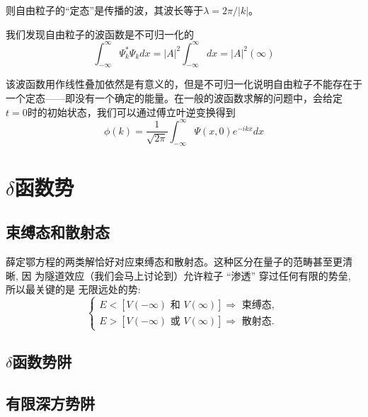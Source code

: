 	则自由粒子的“定态”是传播的波，其波长等于$\lambda=2 \pi /|k|$。

	我们发现自由粒子的波函数是不可归一化的
	\begin{equation}
		\int_{-\infty}^{\infty} \Psi_{k}^{*} \Psi_{k} d x=|A|^{2} \int_{-\infty}^{\infty} d x=|A|^{2}(\infty)
	\end{equation}

	该波函数用作线性叠加依然是有意义的，但是不可归一化说明自由粒子不能存在于一个定态——即没有一个确定的能量。在一般的波函数求解的问题中，会给定$t=0$时的初始状态，我们可以通过傅立叶逆变换得到
	\begin{equation}
		\phi(k)=\frac{1}{\sqrt{2 \pi}} \int_{-\infty}^{\infty} \Psi(x, 0) e^{-i k x} d x
	\end{equation}
\section{$\delta$函数势}
	\subsection{束缚态和散射态}
		薛定鄂方程的两类解恰好对应束缚态和散射态。这种区分在量子的范畴甚至更清晰, 因 为隧道效应（我们会马上讨论到）允许粒子 “渗透” 穿过任何有限的势垒, 所以最关键的是 无限远处的势:
		\begin{equation}
		\left\{\begin{array}{l}
		E<[V(-\infty) \text { 和 } V(\infty)] \Rightarrow \text { 束缚态, } \\
		E>[V(-\infty) \text { 或 } V(\infty)] \Rightarrow \text { 散射态. }
		\end{array}\right.
		\end{equation}
	\subsection{$\delta$函数势阱}
	\subsection{有限深方势阱}






